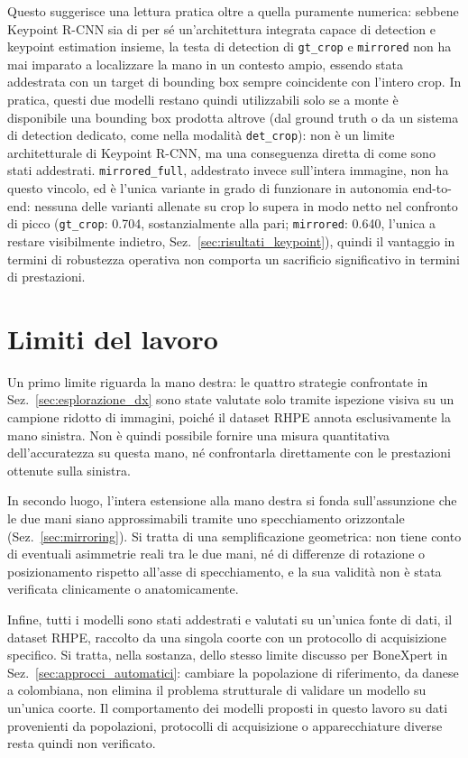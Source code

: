 Questo suggerisce una lettura pratica oltre a quella puramente
numerica: sebbene Keypoint R-CNN sia di per sé un'architettura
integrata capace di detection e keypoint estimation insieme, la testa
di detection di \texttt{gt\_crop} e \texttt{mirrored} non ha mai
imparato a localizzare la mano in un contesto ampio, essendo stata
addestrata con un target di bounding box sempre coincidente con
l'intero crop. In pratica, questi due modelli restano quindi
utilizzabili solo se a monte è disponibile una bounding box prodotta
altrove (dal ground truth o da un sistema di detection dedicato, come
nella modalità \texttt{det\_crop}): non è un limite architetturale di
Keypoint R-CNN, ma una conseguenza diretta di come sono stati
addestrati. \texttt{mirrored\_full}, addestrato invece sull'intera
immagine, non ha questo vincolo, ed è l'unica variante in grado di
funzionare in autonomia end-to-end: nessuna delle varianti allenate su
crop lo supera in modo netto nel confronto di picco
(\texttt{gt\_crop}: 0.704, sostanzialmente alla pari;
\texttt{mirrored}: 0.640, l'unica a restare visibilmente indietro,
Sez.~\ref{sec:risultati_keypoint}), quindi il vantaggio in termini di
robustezza operativa non comporta un sacrificio significativo in
termini di prestazioni.

\section{Limiti del lavoro}

Un primo limite riguarda la mano destra: le quattro strategie
confrontate in Sez.~\ref{sec:esplorazione_dx} sono state valutate solo
tramite ispezione visiva su un campione ridotto di immagini, poiché il
dataset RHPE annota esclusivamente la mano sinistra. Non è quindi
possibile fornire una misura quantitativa dell'accuratezza su questa
mano, né confrontarla direttamente con le prestazioni ottenute sulla
sinistra.

In secondo luogo, l'intera estensione alla mano destra si fonda
sull'assunzione che le due mani siano approssimabili tramite uno
specchiamento orizzontale (Sez.~\ref{sec:mirroring}). Si tratta di una
semplificazione geometrica: non tiene conto di eventuali asimmetrie
reali tra le due mani, né di differenze di rotazione o posizionamento
rispetto all'asse di specchiamento, e la sua validità non è stata
verificata clinicamente o anatomicamente.

Infine, tutti i modelli sono stati addestrati e valutati su un'unica
fonte di dati, il dataset RHPE, raccolto da una singola coorte con un
protocollo di acquisizione specifico. Si tratta, nella sostanza, dello
stesso limite discusso per BoneXpert in
Sez.~\ref{sec:approcci_automatici}: cambiare la popolazione di
riferimento, da danese a colombiana, non elimina il problema
strutturale di validare un modello su un'unica coorte. Il comportamento
dei modelli proposti in questo lavoro su dati provenienti da
popolazioni, protocolli di acquisizione o apparecchiature diverse resta
quindi non verificato.
